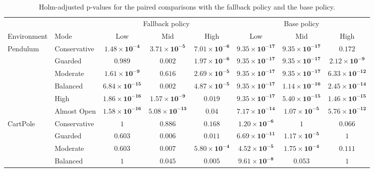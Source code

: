 \begin{table}[t]
  \centering
  \caption{Holm-adjusted p-values for the paired comparisons with
    the fallback policy and the base policy.}
  \label{tab:all_adjusted_p_values}
  \scriptsize
  \begin{tabular}{llcccccc}
    \toprule
    & & \multicolumn{3}{c}{Fallback policy} & \multicolumn{3}{c}{Base policy} \\
    Environment & Mode & Low & Mid & High & Low & Mid & High \\
    \midrule
    Pendulum & Conservative & $\mathbf{1.48\times10^{-4}}$ & $\mathbf{3.71\times10^{-5}}$ & $\mathbf{7.01\times10^{-6}}$ & $\mathbf{9.35\times10^{-17}}$ & $\mathbf{9.35\times10^{-17}}$ & $0.172$ \\
     & Guarded & $0.989$ & $\mathbf{0.002}$ & $\mathbf{1.97\times10^{-6}}$ & $\mathbf{9.35\times10^{-17}}$ & $\mathbf{9.35\times10^{-17}}$ & $\mathbf{2.12\times10^{-9}}$ \\
     & Moderate & $\mathbf{1.61\times10^{-9}}$ & $0.616$ & $\mathbf{2.69\times10^{-5}}$ & $\mathbf{9.35\times10^{-17}}$ & $\mathbf{9.35\times10^{-17}}$ & $\mathbf{6.33\times10^{-12}}$ \\
     & Balanced & $\mathbf{6.84\times10^{-15}}$ & $\mathbf{0.002}$ & $\mathbf{4.87\times10^{-5}}$ & $\mathbf{9.35\times10^{-17}}$ & $\mathbf{1.14\times10^{-16}}$ & $\mathbf{2.45\times10^{-14}}$ \\
     & High & $\mathbf{1.86\times10^{-16}}$ & $\mathbf{1.57\times10^{-9}}$ & $\mathbf{0.019}$ & $\mathbf{9.35\times10^{-17}}$ & $\mathbf{5.40\times10^{-15}}$ & $\mathbf{1.46\times10^{-15}}$ \\
     & Almost Open & $\mathbf{1.58\times10^{-16}}$ & $\mathbf{5.08\times10^{-13}}$ & $\mathbf{0.04}$ & $\mathbf{7.17\times10^{-14}}$ & $\mathbf{1.07\times10^{-5}}$ & $\mathbf{5.76\times10^{-12}}$ \\
    \midrule
    CartPole & Conservative & $1$ & $0.886$ & $0.168$ & $\mathbf{1.20\times10^{-6}}$ & $1$ & $0.066$ \\
     & Guarded & $0.603$ & $\mathbf{0.006}$ & $\mathbf{0.011}$ & $\mathbf{6.69\times10^{-11}}$ & $\mathbf{1.17\times10^{-5}}$ & $1$ \\
     & Moderate & $0.603$ & $\mathbf{0.007}$ & $\mathbf{5.80\times10^{-4}}$ & $\mathbf{4.52\times10^{-5}}$ & $\mathbf{1.75\times10^{-4}}$ & $0.111$ \\
     & Balanced & $1$ & $\mathbf{0.045}$ & $\mathbf{0.005}$ & $\mathbf{9.61\times10^{-8}}$ & $0.053$ & $1$ \\

\end{tabular}
\end{table}
